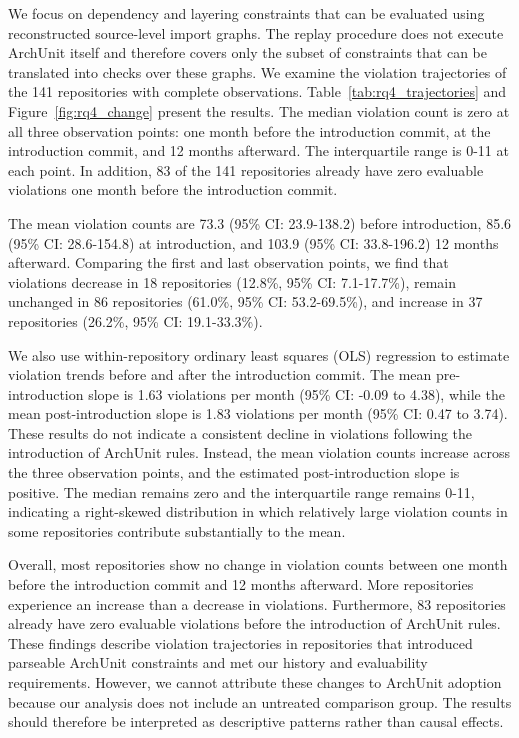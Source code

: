 

We focus on dependency and layering constraints that 
can be evaluated using reconstructed source-level import 
graphs. The replay procedure does not execute ArchUnit 
itself and therefore covers only the subset of constraints 
that can be translated into checks over these graphs.
We examine the violation trajectories of the 141 
repositories with complete observations. 
Table~\ref{tab:rq4_trajectories} and 
Figure~\ref{fig:rq4_change} present the results. 
The median violation count is zero at all three 
observation points: one month before the introduction 
commit, at the introduction commit, and 12 months 
afterward. The interquartile range is 0-11 at each point. 
In addition, 83 of the 141 repositories already have zero 
evaluable violations one month before the introduction 
commit.

The mean violation counts are 73.3 (95\% CI: 23.9-138.2) 
before introduction, 85.6 (95\% CI: 28.6-154.8) at 
introduction, and 103.9 (95\% CI: 33.8-196.2) 12 months 
afterward. Comparing the first and last observation points, we 
find that violations decrease in 18 repositories 
(12.8\%, 95\% CI: 7.1-17.7\%), remain unchanged in 86 repositories 
(61.0\%, 95\% CI: 53.2-69.5\%), and increase in 37 repositories 
(26.2\%, 95\% CI: 19.1-33.3\%).

We also use within-repository ordinary least squares (OLS) 
regression to estimate violation trends before and after 
the introduction commit. The mean pre-introduction slope 
is 1.63 violations per month (95\% CI: -0.09 to 4.38), 
while the mean post-introduction slope is 1.83 violations 
per month (95\% CI: 0.47 to 3.74). These results do not 
indicate a consistent decline in violations following the 
introduction of ArchUnit rules. Instead, the mean 
violation counts increase across the three observation
points, and the estimated post-introduction slope is 
positive. The median remains zero and the interquartile 
range remains 0-11, indicating a right-skewed distribution 
in which relatively large violation counts in some 
repositories contribute substantially to the mean.

Overall, most repositories show no change in violation 
counts between one month before the introduction commit 
and 12 months afterward. More repositories experience an 
increase than a decrease in violations. Furthermore, 83 
repositories already have zero evaluable violations before 
the introduction of ArchUnit rules. These findings 
describe violation trajectories in repositories that 
introduced parseable ArchUnit constraints and met our 
history and evaluability requirements. However, we cannot 
attribute these changes to ArchUnit adoption because our 
analysis does not include an untreated comparison group. 
The results should therefore be interpreted as descriptive 
patterns rather than causal effects.

